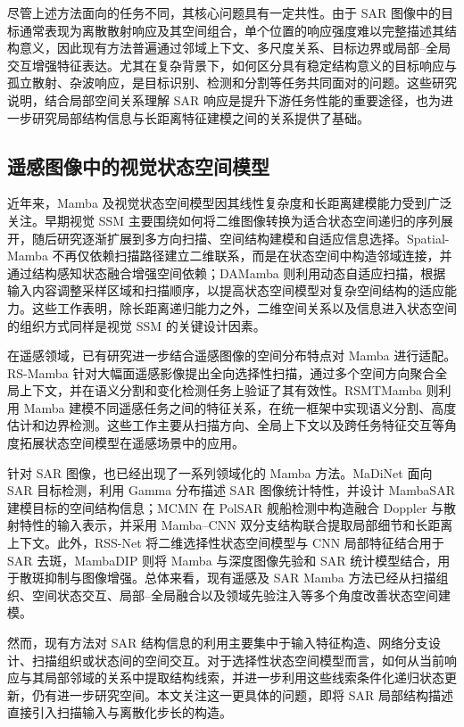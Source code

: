 \documentclass[journal]{IEEEtran}
\begin{document}
尽管上述方法面向的任务不同，其核心问题具有一定共性。由于 SAR 图像中的目标通常表现为离散散射响应及其空间组合，单个位置的响应强度难以完整描述其结构意义，因此现有方法普遍通过邻域上下文、多尺度关系、目标边界或局部--全局交互增强特征表达。尤其在复杂背景下，如何区分具有稳定结构意义的目标响应与孤立散射、杂波响应，是目标识别、检测和分割等任务共同面对的问题。这些研究说明，结合局部空间关系理解 SAR 响应是提升下游任务性能的重要途径，也为进一步研究局部结构信息与长距离特征建模之间的关系提供了基础。


\subsection{遥感图像中的视觉状态空间模型}

近年来，Mamba 及视觉状态空间模型因其线性复杂度和长距离建模能力受到广泛关注。早期视觉 SSM 主要围绕如何将二维图像转换为适合状态空间递归的序列展开，随后研究逐渐扩展到多方向扫描、空间结构建模和自适应信息选择。Spatial-Mamba 不再仅依赖扫描路径建立二维联系，而是在状态空间中构造邻域连接，并通过结构感知状态融合增强空间依赖\cite{spatialmamba2025}；DAMamba 则利用动态自适应扫描，根据输入内容调整采样区域和扫描顺序，以提高状态空间模型对复杂空间结构的适应能力\cite{damamba2025}。这些工作表明，除长距离递归能力之外，二维空间关系以及信息进入状态空间的组织方式同样是视觉 SSM 的关键设计因素。

在遥感领域，已有研究进一步结合遥感图像的空间分布特点对 Mamba 进行适配。RS-Mamba 针对大幅面遥感影像提出全向选择性扫描，通过多个空间方向聚合全局上下文，并在语义分割和变化检测任务上验证了其有效性\cite{rsmamba2024}。RSMTMamba 则利用 Mamba 建模不同遥感任务之间的特征关系，在统一框架中实现语义分割、高度估计和边界检测\cite{rstmtmamba2025}。这些工作主要从扫描方向、全局上下文以及跨任务特征交互等角度拓展状态空间模型在遥感场景中的应用。

针对 SAR 图像，也已经出现了一系列领域化的 Mamba 方法。MaDiNet 面向 SAR 目标检测，利用 Gamma 分布描述 SAR 图像统计特性，并设计 MambaSAR 建模目标的空间结构信息\cite{madinet2025}；MCMN 在 PolSAR 舰船检测中构造融合 Doppler 与散射特性的输入表示，并采用 Mamba--CNN 双分支结构联合提取局部细节和长距离上下文\cite{mcmn}。此外，RSS-Net 将二维选择性状态空间模型与 CNN 局部特征结合用于 SAR 去斑\cite{rssnet}，MambaDIP 则将 Mamba 与深度图像先验和 SAR 统计模型结合，用于散斑抑制与图像增强\cite{mambadip}。总体来看，现有遥感及 SAR Mamba 方法已经从扫描组织、空间状态交互、局部--全局融合以及领域先验注入等多个角度改善状态空间建模。

然而，现有方法对 SAR 结构信息的利用主要集中于输入特征构造、网络分支设计、扫描组织或状态间的空间交互。对于选择性状态空间模型而言，如何从当前响应与其局部邻域的关系中提取结构线索，并进一步利用这些线索条件化递归状态更新，仍有进一步研究空间。本文关注这一更具体的问题，即将 SAR 局部结构描述直接引入扫描输入与离散化步长的构造。
\end{document}
